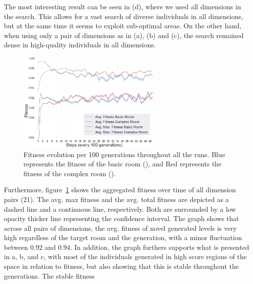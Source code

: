 The most interesting result can be seen in (d), where we used all dimensions in the search. This allows for a vast search of diverse individuals in all dimensions, but at the same time it seems to exploit sub-optimal areas. On the other hand, when using only a pair of dimensions as in (a), (b) and (c), the search remained dense in high-quality individuals in all dimensions.


\begin{figure}[h]
\centerline{\includegraphics[width=7cm]{figures/figure7.png}}
\caption{Fitness evolution per 100 generations throughout all the runs. 
Blue represents the fitness of the basic room (), and Red represents the fitness of the complex room (). 
}
\label{figs:avgfitness}
\end{figure}

Furthermore, figure~\ref{figs:avgfitness} shows the aggregated fitness over time of all dimension pairs (21). The avg. max fitness and the avg. total fitness are depicted as a dashed line and a continuous line, respectively. Both are surrounded by a low opacity thicker line representing the confidence interval. The graph shows that across all pairs of dimensions, the avg. fitness of novel generated levels is very high regardless of the target room and the generation, with a minor fluctuation between $0.92$ and $0.94$. In addition, the graph furthers supports what is presented in  a, b, and c, with most of the individuals generated in high score regions of the space in relation to fitness, but also showing that this is stable throughout the generations. The stable fitness 

